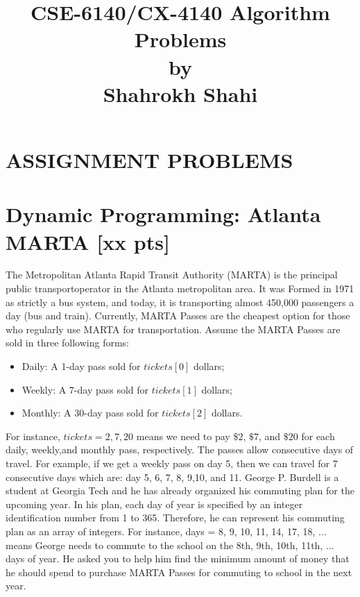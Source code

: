 \documentclass{article}
\title{CSE-6140/CX-4140 Algorithm Problems\\by\\Shahrokh Shahi }
\author{}
\date{}
\begin{document}
\maketitle

\noindent{}
\section*{ASSIGNMENT PROBLEMS}
\section{Dynamic Programming: Atlanta MARTA [xx pts]}
The  Metropolitan  Atlanta  Rapid Transit  Authority  (MARTA) is  the  principal  public  transportoperator in the Atlanta metropolitan area. It was Formed in 1971 as strictly a bus system, and today, it is transporting almost 450,000 passengers a day (bus and train). Currently, MARTA Passes are the cheapest option for those who regularly use MARTA for transportation. Assume the MARTA Passes are sold in three following forms:

\begin{itemize}
\item Daily: A 1-day pass sold for $tickets[0]$ dollars;
\item Weekly: A 7-day pass sold for $tickets[1]$ dollars;
\item Monthly: A 30-day pass sold for $tickets[2]$ dollars.
\end{itemize}

For instance, $tickets = {2, 7, 20}$ means we need to pay $\$2$, $\$7$, and $\$20$ for each daily, weekly,and monthly pass, respectively. The passes allow consecutive days of travel.  For example, if we get a weekly pass on day 5, then we can travel for 7 consecutive days which are: day 5, 6, 7, 8, 9,10, and 11. George P. Burdell is a student at Georgia Tech and he has already organized his commuting plan for  the  upcoming  year.  In  his  plan,  each   day of  year  is  specified   by an  integer   identification number from 1 to 365. Therefore, he can represent his commuting plan as an array of integers. For instance, days = {8, 9, 10, 11, 14, 17, 18, ...} means George needs to commute to the school on the 8th, 9th, 10th, 11th, ... days of year. He asked you to help him find the minimum amount of money that he should spend to purchase MARTA Passes for commuting to school in the next year. 
\end{document}
